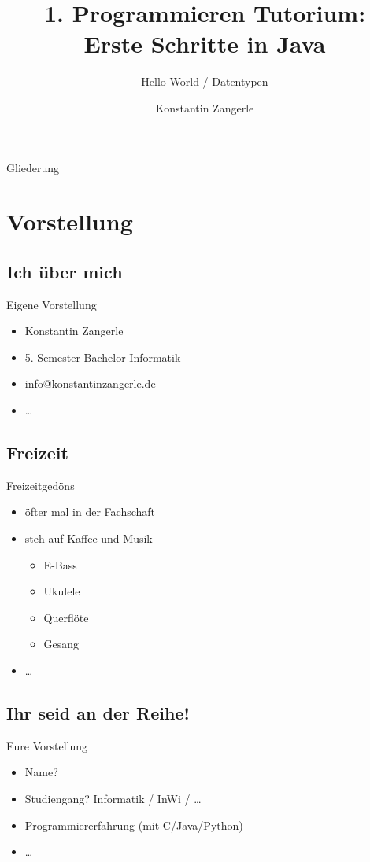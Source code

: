 \documentclass{beamer}
\title[Programmieren Tutorium]{1. Programmieren Tutorium:\\ Erste Schritte in Java}
\subtitle{Hello World / Datentypen}
\author{Konstantin Zangerle}
\begin{document}
\begin{frame}
\titlepage
\end{frame}

\begin{frame}{Gliederung}
\tableofcontents
\end{frame}

\section{Vorstellung}
\subsection{Ich über mich}
\begin{frame}{Eigene Vorstellung}
\begin{itemize}
\item Konstantin Zangerle
\item 5. Semester Bachelor Informatik
\item info@konstantinzangerle.de
\item \dots
\end{itemize}
\end{frame}

\subsection{Freizeit}
\begin{frame}{Freizeitgedöns}
\begin{itemize}
\item öfter mal in der Fachschaft
\item steh auf Kaffee und Musik
\begin{itemize}
 \item E-Bass
 \item Ukulele
 \item Querflöte
 \item Gesang
\end{itemize}

\item \dots
\end{itemize}
\end{frame}

\subsection{Ihr seid an der Reihe!}
\begin{frame}{Eure Vorstellung}
\begin{itemize}
\item Name?
\item Studiengang? Informatik / InWi / \dots
\item Programmiererfahrung (mit C/Java/Python)
\item \dots
\end{itemize}
\end{frame}
\end{document}
